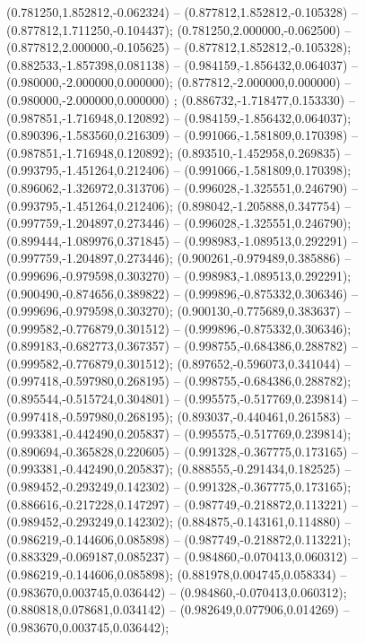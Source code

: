  (0.781250,1.852812,-0.062324) -- (0.877812,1.852812,-0.105328) -- (0.877812,1.711250,-0.104437);
 (0.781250,2.000000,-0.062500) -- (0.877812,2.000000,-0.105625) -- (0.877812,1.852812,-0.105328);
 (0.882533,-1.857398,0.081138) -- (0.984159,-1.856432,0.064037) -- (0.980000,-2.000000,0.000000);
 (0.877812,-2.000000,0.000000) -- (0.980000,-2.000000,0.000000) ;
 (0.886732,-1.718477,0.153330) -- (0.987851,-1.716948,0.120892) -- (0.984159,-1.856432,0.064037);
 (0.890396,-1.583560,0.216309) -- (0.991066,-1.581809,0.170398) -- (0.987851,-1.716948,0.120892);
 (0.893510,-1.452958,0.269835) -- (0.993795,-1.451264,0.212406) -- (0.991066,-1.581809,0.170398);
 (0.896062,-1.326972,0.313706) -- (0.996028,-1.325551,0.246790) -- (0.993795,-1.451264,0.212406);
 (0.898042,-1.205888,0.347754) -- (0.997759,-1.204897,0.273446) -- (0.996028,-1.325551,0.246790);
 (0.899444,-1.089976,0.371845) -- (0.998983,-1.089513,0.292291) -- (0.997759,-1.204897,0.273446);
 (0.900261,-0.979489,0.385886) -- (0.999696,-0.979598,0.303270) -- (0.998983,-1.089513,0.292291);
 (0.900490,-0.874656,0.389822) -- (0.999896,-0.875332,0.306346) -- (0.999696,-0.979598,0.303270);
 (0.900130,-0.775689,0.383637) -- (0.999582,-0.776879,0.301512) -- (0.999896,-0.875332,0.306346);
 (0.899183,-0.682773,0.367357) -- (0.998755,-0.684386,0.288782) -- (0.999582,-0.776879,0.301512);
 (0.897652,-0.596073,0.341044) -- (0.997418,-0.597980,0.268195) -- (0.998755,-0.684386,0.288782);
 (0.895544,-0.515724,0.304801) -- (0.995575,-0.517769,0.239814) -- (0.997418,-0.597980,0.268195);
 (0.893037,-0.440461,0.261583) -- (0.993381,-0.442490,0.205837) -- (0.995575,-0.517769,0.239814);
 (0.890694,-0.365828,0.220605) -- (0.991328,-0.367775,0.173165) -- (0.993381,-0.442490,0.205837);
 (0.888555,-0.291434,0.182525) -- (0.989452,-0.293249,0.142302) -- (0.991328,-0.367775,0.173165);
 (0.886616,-0.217228,0.147297) -- (0.987749,-0.218872,0.113221) -- (0.989452,-0.293249,0.142302);
 (0.884875,-0.143161,0.114880) -- (0.986219,-0.144606,0.085898) -- (0.987749,-0.218872,0.113221);
 (0.883329,-0.069187,0.085237) -- (0.984860,-0.070413,0.060312) -- (0.986219,-0.144606,0.085898);
 (0.881978,0.004745,0.058334) -- (0.983670,0.003745,0.036442) -- (0.984860,-0.070413,0.060312);
 (0.880818,0.078681,0.034142) -- (0.982649,0.077906,0.014269) -- (0.983670,0.003745,0.036442);
